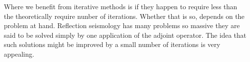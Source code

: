 
\par
Where we benefit from iterative methods is if they happen to require less than
the theoretically require nunber of iterations.
Whether that is so, depends on the problem at hand.
Reflection seismology has many problems so massive they are said
to be solved simply by one application of the adjoint operator.
The idea that such solutions might be improved
by a small number of iterations is very appealing.


